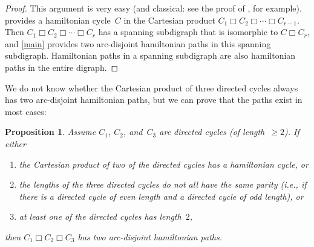 \documentclass[11pt]{amsart}
\newtheorem{prop}[equation]{Proposition}
\theoremstyle{definition}
\newcounter{case}
\numberwithin{case}{startcases}
\numberwithin{equation}{section}
\newcommand{\cartprod}{\mathbin{\Box}}
\begin{document}
	\begin{proof}
		This argument is very easy (and classical: see the proof of \cite[Lem.~9.2]{Curran}, for example).
		 provides a hamiltonian cycle~$C$ in the Cartesian product $C_1 \cartprod C_2 \cartprod \cdots \cartprod C_{r-1}$. Then $C_1 \cartprod C_2 \cartprod \cdots \cartprod C_r$ has a spanning subdigraph that is isomorphic to $C \cartprod C_r$, and \cref{main} provides two arc-disjoint hamiltonian paths in this spanning subdigraph. Hamiltonian paths in a spanning subdigraph are also hamiltonian paths in the entire digraph.
	\end{proof}
	
	We do not know whether the Cartesian product of three directed cycles always has two arc-disjoint hamiltonian paths, but we can prove that the paths exist in most cases:
	
	\begin{prop} \label{C1C2C3}
		Assume $C_1$, $C_2$, and~$C_3$ are directed cycles \textup(of length~$\ge 2$\textup). If either
		\begin{enumerate}
			\item \label{C1C2C3-ham}
			the Cartesian product of two of the directed cycles has a hamiltonian cycle,
			or
			\item \label{C1C2C3-parity}
			the lengths of the three directed cycles do not all have the same parity \textup(i.e., if there is a directed cycle of even length and a directed cycle of odd length\textup),
			or
			\item \label{C1C2C3-len2}
			at least one of the directed cycles has length~$2$,
		\end{enumerate}
		then $C_1 \cartprod C_2 \cartprod C_3$ has two arc-disjoint hamiltonian paths.
	\end{prop}
	
\end{document}
